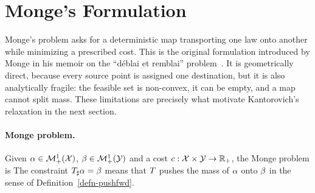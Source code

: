 \section{Monge's Formulation}
\label{sec-monge-formulation}
\label{sec-continuous-monge}

Monge's problem asks for a deterministic map transporting one law onto another while minimizing a prescribed cost. This is the original formulation introduced by Monge in his memoir on the ``d\'eblai et remblai'' problem~\cite{Monge1781}. It is geometrically direct, because every source point is assigned one destination, but it is also analytically fragile: the feasible set is non-convex, it can be empty, and a map cannot split mass. These limitations are precisely what motivate Kantorovich's relaxation in the next section.

\paragraph{Monge problem.}

Given $\alpha\in\mathcal{M}_+^1(\mathcal{X})$, $\beta\in\mathcal{M}_+^1(\mathcal{Y})$ and a cost $c:\mathcal{X}\times\mathcal{Y}\to\mathbb{R}_+$, the Monge problem is
The constraint $T_\sharp\alpha=\beta$ means that $T$ pushes the mass of $\alpha$ onto $\beta$ in the sense of Definition~\ref{defn-pushfwd}.

